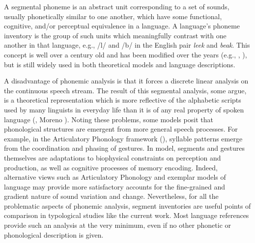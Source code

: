   A segmental phoneme is an abstract unit corresponding to a set of sounds, usually phonetically similar to one another, which have some functional, cognitive, and/or perceptual equivalence in a language. A language’s phoneme inventory is the group of such units which meaningfully contrast with one another in that language, e.g., /l/ and /b/ in the English pair \textit{leek} and \textit{beak}. This concept is well over a century old and has been modified over the years (e.g., \citealt{Sapir1925}, \citealt{ChomskyHalle1968}), but is still widely used in both theoretical models and language descriptions. 



  A disadvantage of phonemic analysis is that it forces a discrete linear analysis on the continuous speech stream. The result of this segmental analysis, some argue, is a theoretical representation which is more reflective of the alphabetic scripts used by many linguists in everyday life than it is of any real property of spoken language (\citealt{Port2006}, Moreno \citealt{Cabrera2008}). Noting these problems, some models posit that phonological structures are emergent from more general speech processes. For example, in the Articulatory Phonology framework (\citealt{BrowmanGoldstein1992b}), syllable patterns emerge from the coordination and phasing of gestures. In  model, segments and gestures themselves are adaptations to biophysical constraints on perception and production, as well as cognitive processes of memory encoding. Indeed, alternative views such as Articulatory Phonology and exemplar models of language \citep{Bybee2001} may provide more satisfactory accounts for the fine-grained and gradient nature of sound variation and change. Nevertheless, for all the problematic aspects of phonemic analysis, segment inventories are useful points of comparison in typological studies like the current work. Most language references provide such an analysis at the very minimum, even if no other phonetic or phonological description is given.



